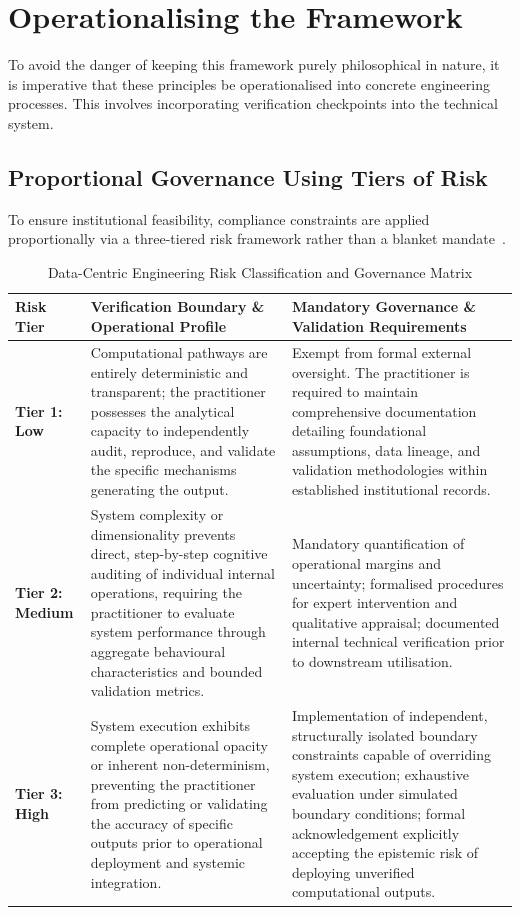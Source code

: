 ﻿\documentclass[11pt,a4paper]{article}
\begin{document}
\section{Operationalising the Framework}
\label{sec:operationalizing}

To avoid the danger of keeping this framework purely philosophical in nature, it is imperative that these principles be operationalised into concrete engineering processes. This involves incorporating verification checkpoints into the technical system.

\subsection{Proportional Governance Using Tiers of Risk}
To ensure institutional feasibility, compliance constraints are applied proportionally via a three-tiered risk framework rather than a blanket mandate~\cite{eu_ai_act2024, nist_ai_rmf}.

\begin{table}[H]
\centering
\caption{Data-Centric Engineering Risk Classification and Governance Matrix}
\label{tab:risk_tiers}
\vspace{2mm}
\small
\begin{tabularx}{\textwidth}{l X X}
\toprule
\textbf{Risk Tier} & \textbf{Verification Boundary \& Operational Profile} & \textbf{Mandatory Governance \& Validation Requirements} \\
\midrule
\textbf{Tier 1: Low} & Computational pathways are entirely deterministic and transparent; the practitioner possesses the analytical capacity to independently audit, reproduce, and validate the specific mechanisms generating the output. & Exempt from formal external oversight. The practitioner is required to maintain comprehensive documentation detailing foundational assumptions, data lineage, and validation methodologies within established institutional records. \\
\midrule
\textbf{Tier 2: Medium} & System complexity or dimensionality prevents direct, step-by-step cognitive auditing of individual internal operations, requiring the practitioner to evaluate system performance through aggregate behavioural characteristics and bounded validation metrics. & Mandatory quantification of operational margins and uncertainty; formalised procedures for expert intervention and qualitative appraisal; documented internal technical verification prior to downstream utilisation. \\
\midrule
\textbf{Tier 3: High} & System execution exhibits complete operational opacity or inherent non-determinism, preventing the practitioner from predicting or validating the accuracy of specific outputs prior to operational deployment and systemic integration. & Implementation of independent, structurally isolated boundary constraints capable of overriding system execution; exhaustive evaluation under simulated boundary conditions; formal acknowledgement explicitly accepting the epistemic risk of deploying unverified computational outputs. \\
\bottomrule
\end{tabularx}
\end{table}
\end{document}
